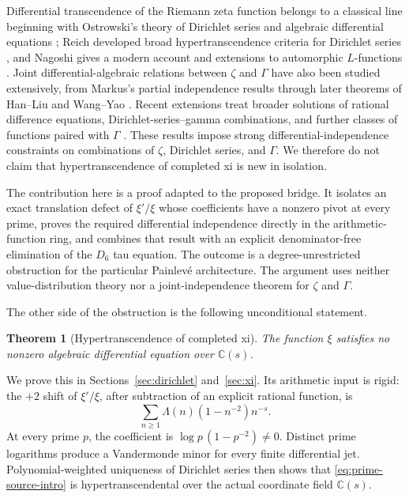 \documentclass[11pt]{article}
\numberwithin{equation}{section}
\newtheorem{theorem}{Theorem}[section]
\theoremstyle{definition}
\theoremstyle{remark}
\newcommand{\C}{\mathbb C}
\begin{document}
Differential transcendence of the Riemann zeta function belongs to a classical line beginning
with Ostrowski's theory of Dirichlet series and algebraic differential equations
\cite{Ostrowski1920}; Reich developed broad hypertranscendence criteria for Dirichlet series
\cite{Reich1982,Reich1984}, and Nagoshi gives a modern account and extensions to automorphic
$L$-functions \cite{Nagoshi2016}.  Joint differential-algebraic relations between $\zeta$ and
$\Gamma$ have also been studied extensively, from Markus's partial independence results
\cite{Markus2007} through later theorems of Han--Liu and Wang--Yao
\cite{HanLiu2021,WangYao2024}.  Recent extensions treat broader solutions of rational difference
equations, Dirichlet-series--gamma combinations, and further classes of functions paired with
$\Gamma$ \cite{Lu2025Markus,LuJiangLu2025,LuMaCao2026}.  These results impose strong
differential-independence constraints on combinations of $\zeta$, Dirichlet series, and
$\Gamma$.  We therefore do not claim that hypertranscendence of completed xi is new in isolation.

The contribution here is a proof adapted to the proposed bridge.  It isolates an exact
translation defect of $\xi'/\xi$ whose coefficients have a nonzero pivot at every prime, proves
the required differential independence directly in the arithmetic-function ring, and combines
that result with an explicit denominator-free elimination of the $D_6$ tau equation.  The outcome
is a degree-unrestricted obstruction for the particular Painlev\'e architecture.  The argument
uses neither value-distribution theory nor a joint-independence theorem for $\zeta$ and $\Gamma$.

The other side of the obstruction is the following unconditional statement.

\begin{theorem}[Hypertranscendence of completed xi]
\label{thm:xi-ht-intro}
The function $\xi$ satisfies no nonzero algebraic differential equation over $\C(s)$.
\end{theorem}

We prove this in Sections~\ref{sec:dirichlet} and~\ref{sec:xi}.  Its arithmetic
input is rigid: the $+2$ shift of $\xi'/\xi$, after subtraction of an explicit
rational function, is
\begin{equation}
 \sum_{n\geq1}\Lambda(n)(1-n^{-2})n^{-s}.
 \label{eq:prime-source-intro}
\end{equation}
At every prime $p$, the coefficient is $\log p\,(1-p^{-2})\neq0$.  Distinct prime logarithms
produce a Vandermonde minor for every finite differential jet.  Polynomial-weighted uniqueness
of Dirichlet series then shows that \eqref{eq:prime-source-intro} is hypertranscendental over the
actual coordinate field $\C(s)$.
\end{document}
